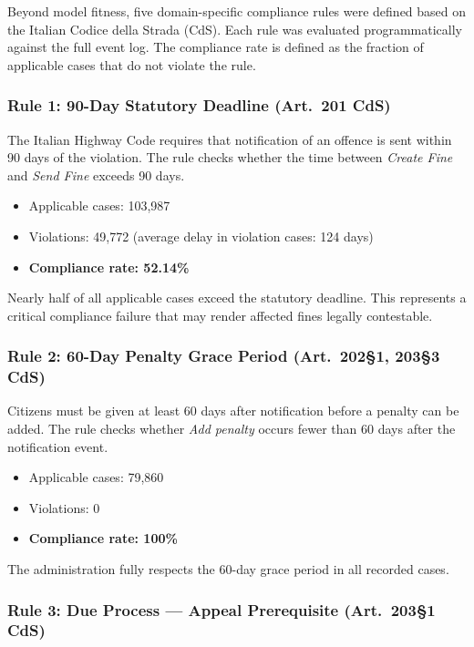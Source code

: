 Beyond model fitness, five domain-specific compliance rules were defined based on the Italian Codice della Strada (CdS). Each rule was evaluated programmatically against the full event log. The compliance rate is defined as the fraction of applicable cases that do not violate the rule.

\subsubsection{Rule 1: 90-Day Statutory Deadline (Art.\ 201 CdS)}

The Italian Highway Code requires that notification of an offence is sent within 90 days of the violation. The rule checks whether the time between \textit{Create Fine} and \textit{Send Fine} exceeds 90 days.

\begin{itemize}
    \item Applicable cases: 103,987
    \item Violations: 49,772 (average delay in violation cases: 124 days)
    \item \textbf{Compliance rate: 52.14\%}
\end{itemize}

Nearly half of all applicable cases exceed the statutory deadline. This represents a critical compliance failure that may render affected fines legally contestable.

\subsubsection{Rule 2: 60-Day Penalty Grace Period (Art.\ 202\S1, 203\S3 CdS)}

Citizens must be given at least 60 days after notification before a penalty can be added. The rule checks whether \textit{Add penalty} occurs fewer than 60 days after the notification event.

\begin{itemize}
    \item Applicable cases: 79,860
    \item Violations: 0
    \item \textbf{Compliance rate: 100\%}
\end{itemize}

The administration fully respects the 60-day grace period in all recorded cases.

\subsubsection{Rule 3: Due Process — Appeal Prerequisite (Art.\ 203\S1 CdS)}


